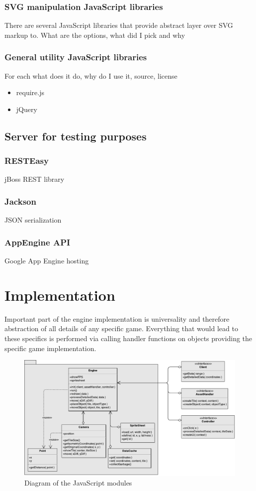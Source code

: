\documentclass[11pt,oneside, final]{fithesis2}
\begin{document}
\subsection{SVG manipulation JavaScript libraries}
There are several JavaScript libraries that provide abstract layer over SVG markup to.
What are the options, what did I pick and why

\subsection{General utility JavaScript libraries}
For each what does it do, why do I use it, source, license
\begin{itemize}
	\item require.js
	\item jQuery
\end{itemize}

\section{Server for testing purposes}
\subsection{RESTEasy}
jBoss REST library

\subsection{Jackson}
JSON serialization

\subsection{AppEngine API}
Google App Engine hosting

\chapter{Implementation}
\label{implementation}
Important part of the engine implementation is universality and therefore abstraction of all details of any specific game. Everything that would lead to these specifics is performed via calling handler functions on objects providing the specific game implementation.

\begin{figure}[htp]
	\centering
	\includegraphics[width=\textwidth]{thesis-classdiagram}
	\caption{Diagram of the JavaScript modules}
	\label{classdiagram}
\end{figure}
\end{document}
